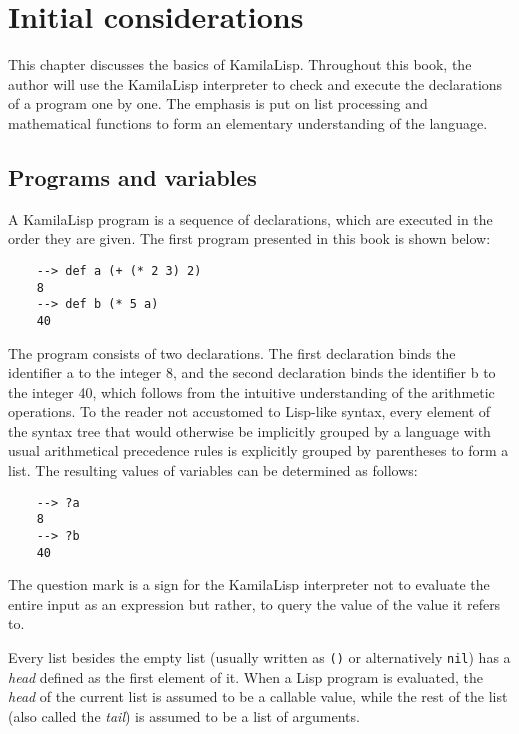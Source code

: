 
\chapter{Initial considerations}

This chapter discusses the basics of KamilaLisp. Throughout this book, the author will use the KamilaLisp interpreter to check and execute the declarations of a program one by one. The emphasis is put on list processing and mathematical functions to form an elementary understanding of the language.

\section{Programs and variables}

A KamilaLisp program is a sequence of declarations, which are executed in the order they are given. The first program presented in this book is shown below:

\begin{Verbatim}
    --> def a (+ (* 2 3) 2)
    8
    --> def b (* 5 a)
    40
\end{Verbatim}

The program consists of two declarations. The first declaration binds the identifier a to the integer 8, and the second declaration binds the identifier b to the integer 40, which follows from the intuitive understanding of the arithmetic operations. To the reader not accustomed to Lisp-like syntax, every element of the syntax tree that would otherwise be implicitly grouped by a language with usual arithmetical precedence rules is explicitly grouped by parentheses to form a list. The resulting values of variables can be determined as follows:

\begin{Verbatim}
    --> ?a
    8
    --> ?b
    40
\end{Verbatim}

The question mark is a sign for the KamilaLisp interpreter not to evaluate the entire input as an expression but rather, to query the value of the value it refers to.

Every list besides the empty list (usually written as \verb|()| or alternatively \verb|nil|) has a \textit{head} defined as the first element of it. When a Lisp program is evaluated, the \textit{head} of the current list is assumed to be a callable value, while the rest of the list (also called the \textit{tail}) is assumed to be a list of arguments.

